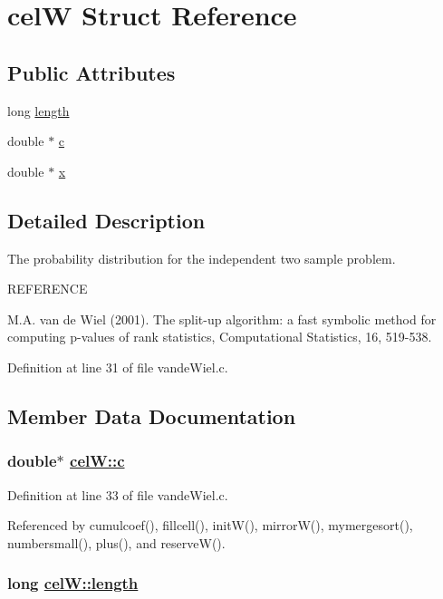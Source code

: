 \hypertarget{structcelW}{
\section{cel\-W Struct Reference}
\label{structcelW}
}
\subsection*{Public Attributes}
\begin{CompactItemize}
\item 
long \hyperlink{structcelW_o0}{length}
\item 
double $\ast$ \hyperlink{structcelW_o1}{c}
\item 
double $\ast$ \hyperlink{structcelW_o2}{x}
\end{CompactItemize}


\subsection{Detailed Description}
The probability distribution for the independent two sample problem.

REFERENCE

M.A. van de Wiel (2001). The split-up algorithm: a fast symbolic method for computing p-values of rank statistics, Computational Statistics, 16, 519-538. 



Definition at line 31 of file vande\-Wiel.c.

\subsection{Member Data Documentation}
\hypertarget{structcelW_o1}{
\subsubsection[c]{\setlength{\rightskip}{0pt plus 5cm}double$\ast$ \hyperlink{structcelW_o1}{cel\-W::c}}}
\label{structcelW_o1}




Definition at line 33 of file vande\-Wiel.c.

Referenced by cumulcoef(), fillcell(), init\-W(), mirror\-W(), mymergesort(), numbersmall(), plus(), and reserve\-W().\hypertarget{structcelW_o0}{
\subsubsection[length]{\setlength{\rightskip}{0pt plus 5cm}long \hyperlink{structcelW_o0}{cel\-W::length}}}
\label{structcelW_o0}




